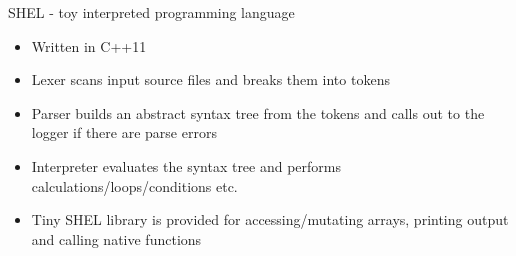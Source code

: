 \item SHEL - toy interpreted programming language
\begin{itemize}
    \item Written in C++11
    \item Lexer scans input source files and breaks them into tokens
    \item Parser builds an abstract syntax tree from the tokens and calls out to the logger if there are parse errors
    \item Interpreter evaluates the syntax tree and performs calculations/loops/conditions etc.
    \item Tiny SHEL library is provided for accessing/mutating arrays, printing output and calling native functions
\end{itemize}
\bigbreak
